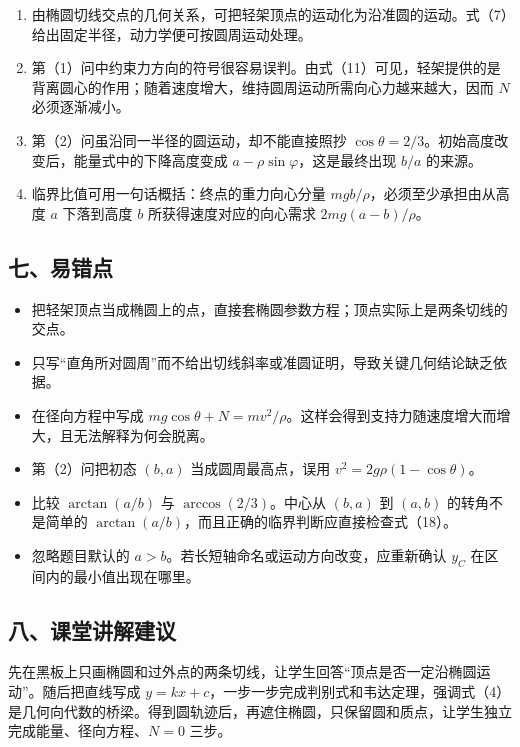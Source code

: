 \documentclass[12pt,a4paper,UTF8]{ctexart}
\newcommand{\tightlist}{\setlength{\itemsep}{0pt}\setlength{\parskip}{0pt}}
\begin{document}
\begin{enumerate}
\def\labelenumi{\arabic{enumi}.}
\tightlist
\item
  由椭圆切线交点的几何关系，可把轻架顶点的运动化为沿准圆的运动。式（7）给出固定半径，动力学便可按圆周运动处理。
\item
  第（1）问中约束力方向的符号很容易误判。由式（11）可见，轻架提供的是背离圆心的作用；随着速度增大，维持圆周运动所需向心力越来越大，因而
  \(N\) 必须逐渐减小。
\item
  第（2）问虽沿同一半径的圆运动，却不能直接照抄
  \(\cos\theta=2/3\)。初始高度改变后，能量式中的下降高度变成
  \(a-\rho\sin\varphi\)，这是最终出现 \(b/a\) 的来源。
\item
  临界比值可用一句话概括：终点的重力向心分量
  \(mgb/\rho\)，必须至少承担由从高度 \(a\) 下落到高度 \(b\)
  所获得速度对应的向心需求 \(2mg(a-b)/\rho\)。
\end{enumerate}

\subsection{七、易错点}\label{ux4e03ux6613ux9519ux70b9}

\begin{itemize}
\tightlist
\item
  把轻架顶点当成椭圆上的点，直接套椭圆参数方程；顶点实际上是两条切线的交点。
\item
  只写``直角所对圆周''而不给出切线斜率或准圆证明，导致关键几何结论缺乏依据。
\item
  在径向方程中写成
  \(mg\cos\theta+N=mv^2/\rho\)。这样会得到支持力随速度增大而增大，且无法解释为何会脱离。
\item
  第（2）问把初态 \((b,a)\) 当成圆周最高点，误用
  \(v^2=2g\rho(1-\cos\theta)\)。
\item
  比较 \(\arctan(a/b)\) 与 \(\arccos(2/3)\)。中心从 \((b,a)\) 到
  \((a,b)\) 的转角不是简单的
  \(\arctan(a/b)\)，而且正确的临界判断应直接检查式（18）。
\item
  忽略题目默认的 \(a>b\)。若长短轴命名或运动方向改变，应重新确认 \(y_C\)
  在区间内的最小值出现在哪里。
\end{itemize}

\subsection{八、课堂讲解建议}\label{ux516bux8bfeux5802ux8bb2ux89e3ux5efaux8bae}

先在黑板上只画椭圆和过外点的两条切线，让学生回答``顶点是否一定沿椭圆运动''。随后把直线写成
\(y=kx+c\)，一步一步完成判别式和韦达定理，强调式（4）是几何向代数的桥梁。得到圆轨迹后，再遮住椭圆，只保留圆和质点，让学生独立完成能量、径向方程、\(N=0\)
三步。
\end{document}

